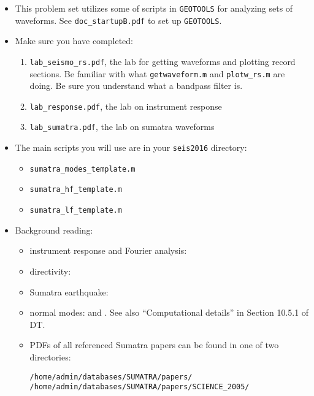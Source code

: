 \documentclass[11pt,titlepage,fleqn]{article}
\begin{document}
\begin{itemize}
\item This problem set utilizes some of scripts in \verb+GEOTOOLS+ for analyzing sets of waveforms. See \verb+doc_startupB.pdf+ to set up \verb+GEOTOOLS+.


\item Make sure you have completed:
%
\begin{enumerate}
\item \verb+lab_seismo_rs.pdf+, the lab for getting waveforms and plotting record sections.
Be familiar with what \verb+getwaveform.m+ and \verb+plotw_rs.m+ are doing.
Be sure you understand what a bandpass filter is.

\item \verb+lab_response.pdf+, the lab on instrument response

\item \verb+lab_sumatra.pdf+, the lab on sumatra waveforms
\end{enumerate}


\item The main scripts you will use are in your \verb+seis2016+ directory:
%
\begin{itemize}
\item \verb+sumatra_modes_template.m+
\item \verb+sumatra_hf_template.m+
\item \verb+sumatra_lf_template.m+
\end{itemize}


\item Background reading:

\begin{itemize}
\item instrument response and Fourier analysis: \citet[][Ch.~6]{SteinWysession}
\item directivity: \citet[][Section 4.3.2]{SteinWysession} 
\item Sumatra earthquake: \citet{Lay2005,Ammon2005,Park2005,Ni2005,SSteinOkal2007}
\item normal modes: \citet[][Section 2.9]{SteinWysession} and \citet[][Ch.~8]{DT}. See also ``Computational details'' in Section 10.5.1 of DT.
\item PDFs of all referenced Sumatra papers can be found in one of two directories:
%
\begin{verbatim}
/home/admin/databases/SUMATRA/papers/
/home/admin/databases/SUMATRA/papers/SCIENCE_2005/
\end{verbatim}


\end{itemize}
\end{itemize}
\end{document}
